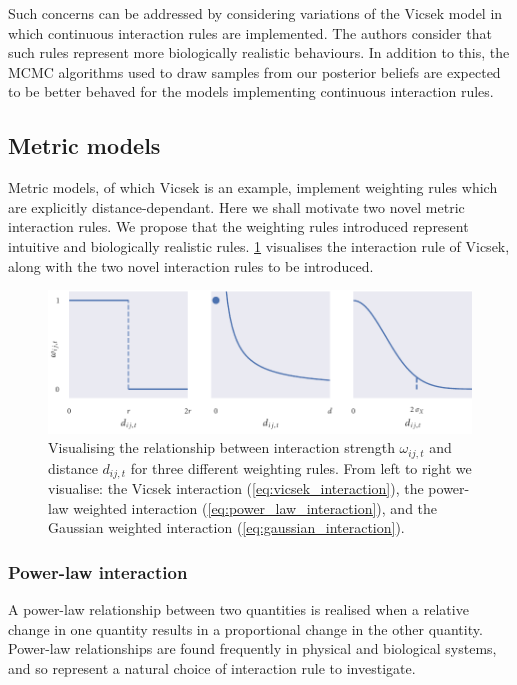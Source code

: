 Such concerns can be addressed by considering variations of the Vicsek model in which
continuous interaction rules are implemented. The authors consider that such rules
represent more biologically realistic behaviours. In addition to this, the MCMC algorithms
used to draw samples from our posterior beliefs are expected to be better behaved for the
models implementing continuous interaction rules.

\subsection{Metric models}

Metric models, of which Vicsek is an example, implement weighting rules which are
explicitly distance-dependant. Here we shall motivate two novel metric interaction rules.
We propose that the weighting rules introduced represent intuitive and biologically
realistic rules. \cref{fig:weighting_rules} visualises the interaction rule of Vicsek,
along with the two novel interaction rules to be introduced.

\begin{figure}[tb]
    \includegraphics{weighting_rules.pdf}
    \caption{Visualising the relationship between interaction strength $\omega_{ij,t}$ and
        distance $d_{ij,t}$ for three different weighting rules. From left to right we
        visualise: the Vicsek interaction (\cref{eq:vicsek_interaction}), the power-law
        weighted interaction (\cref{eq:power_law_interaction}), and the Gaussian weighted
    interaction (\cref{eq:gaussian_interaction}).}
    \label{fig:weighting_rules}
\end{figure}

\subsubsection{Power-law interaction}

A power-law relationship between two quantities is realised when a relative change in
one quantity results in a proportional change in the other quantity. Power-law
relationships are found frequently in physical and biological systems, and so represent a
natural choice of interaction rule to investigate.

